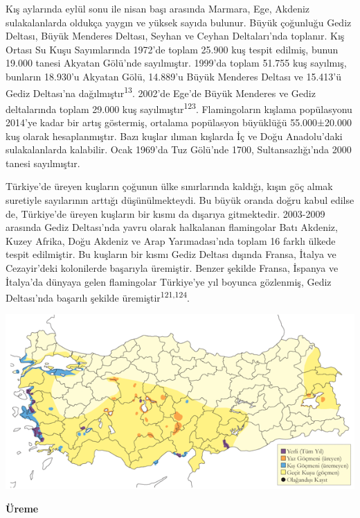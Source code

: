 \documentclass[
  letterpaper,
  DIV=11,
  numbers=noendperiod]{scrreprt}
\begin{document}
Kış aylarında eylül sonu ile nisan başı arasında Marmara, Ege, Akdeniz
sulakalanlarda oldukça yaygın ve yüksek sayıda bulunur. Büyük çoğunluğu
Gediz Deltası, Büyük Menderes Deltası, Seyhan ve Ceyhan Deltaları'nda
toplanır. Kış Ortası Su Kuşu Sayımlarında 1972'de toplam 25.900 kuş
tespit edilmiş, bunun 19.000 tanesi Akyatan Gölü'nde sayılmıştır.
1999'da toplam 51.755 kuş sayılmış, bunların 18.930'u Akyatan Gölü,
14.889'u Büyük Menderes Deltası ve 15.413'ü Gediz Deltası'na
dağılmıştır\textsuperscript{13}. 2002'de Ege'de Büyük Menderes ve Gediz
deltalarında toplam 29.000 kuş sayılmıştır\textsuperscript{123}.
Flamingoların kışlama popülasyonu 2014'ye kadar bir artış göstermiş,
ortalama popülasyon büyüklüğü 55.000±20.000 kuş olarak hesaplanmıştır.
Bazı kuşlar ılıman kışlarda İç ve Doğu Anadolu'daki sulakalanlarda
kalabilir. Ocak 1969'da Tuz Gölü'nde 1700, Sultansazlığı'nda 2000 tanesi
sayılmıştır.

Türkiye'de üreyen kuşların çoğunun ülke sınırlarında kaldığı, kışın göç
almak suretiyle sayılarının arttığı düşünülmekteydi. Bu büyük oranda
doğru kabul edilse de, Türkiye'de üreyen kuşların bir kısmı da dışarıya
gitmektedir. 2003-2009 arasında Gediz Deltası'nda yavru olarak
halkalanan flamingolar Batı Akdeniz, Kuzey Afrika, Doğu Akdeniz ve Arap
Yarımadası'nda toplam 16 farklı ülkede tespit edilmiştir. Bu kuşların
bir kısmı Gediz Deltası dışında Fransa, İtalya ve Cezayir'deki
kolonilerde başarıyla üremiştir. Benzer şekilde Fransa, İspanya ve
İtalya'da dünyaya gelen flamingolar Türkiye'ye yıl boyunca gözlenmiş,
Gediz Deltası'nda başarılı şekilde üremiştir\textsuperscript{121,124}.

\includegraphics{images/harita_Page_056.png}

\textbf{Üreme}
\end{document}
